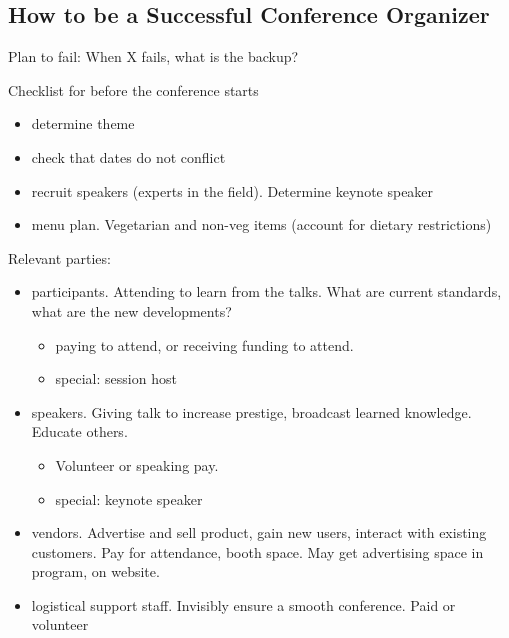 \subsection{How to be a Successful Conference Organizer}



Plan to fail: When X fails, what is the backup?


Checklist for before the conference starts
\begin{itemize}
    \item determine theme
    \item check that dates do not conflict
    \item recruit speakers (experts in the field).
Determine keynote speaker
\item menu plan. 
Vegetarian and non-veg items (account for dietary restrictions)
\end{itemize}




Relevant parties:
\begin{itemize}
    \item participants. Attending to learn from the talks. What are current standards, what are the new developments?
    \begin{itemize}
        \item paying to attend, or receiving funding to attend. 
        \item special: session host
    \end{itemize}
    \item speakers. Giving talk to increase prestige, broadcast learned knowledge. Educate others.
    \begin{itemize}
        \item Volunteer or speaking pay. 
        \item special: keynote speaker
    \end{itemize}
    \item vendors. Advertise and sell product, gain new users, interact with existing customers. Pay for attendance, booth space. May get advertising space in program, on website.
    \item logistical support staff. Invisibly ensure a smooth conference. 
Paid or volunteer
\end{itemize}


